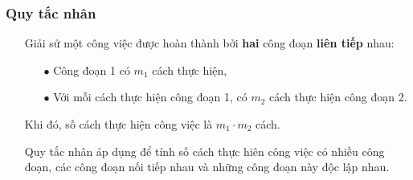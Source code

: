 \subsubsection{Quy tắc nhân}
\begin{itemize}
	\item [\iconMT]  
	\begin{tcolorbox}[colframe=orange,colback=orange!3,boxrule=0.2mm]
		Giải sử một công việc được hoàn thành bởi \textbf{hai} công đoạn \textbf{liên tiếp} nhau:
		\begin{itemize}
			\item [$\bullet$] Công đoạn 1 có $m_1$ cách thực hiện, 
			\item [$\bullet$] Với mỗi cách thực hiện công đoạn 1, có  $m_2$ cách thực hiện công đoạn 2.
		\end{itemize}
		Khi đó, số cách thực hiện công việc là $m_1 \cdot m_2$ cách.
	\end{tcolorbox}
	\item [\iconMT]  Quy tắc nhân áp dụng để tính số cách thực hiên công việc có nhiều công đoạn, các công đoạn nối tiếp nhau và những công đoạn này độc lập nhau.
\end{itemize}
